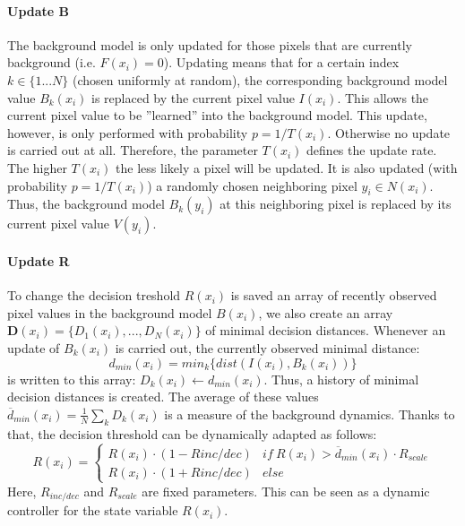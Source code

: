 \paragraph{Update B}
The background model is only updated for those pixels that
are currently background (i.e. $F(x_i) = 0$).
Updating means that for a certain index $k \in \{1...N \}$ (chosen uniformly at random), the corresponding background model value $B_k(x_i)$ is replaced by the current pixel value $I(x_i)$.
This allows the current pixel value to be ”learned” into the background model. This update, however, is only performed with probability $p = 1/T(x_i)$. Otherwise no update
is carried out at all. Therefore, the parameter $T(x_i)$ defines the update rate. The higher $T(x_i)$ the less likely a pixel will be updated.
It is also updated (with probability $p = 1/T(x_i)$) a randomly chosen neighboring pixel $y_i \in N(x_i)$. Thus, the background model $B_k(y_i)$ at this neighboring pixel is replaced by its current pixel value $V(y_i)$.
\paragraph{Update R}
To change the decision treshold $R(x_i)$ is saved an array of recently observed pixel values in the background model $B(x_i)$, we also create an array $\mathbf{D}(x_i) = \{D_1(x_i ),...,D_N(x_i)\}$ of minimal decision distances. Whenever an update of $B_k(x_i)$ is carried out, the currently observed minimal distance:
\[ d_{min}(x_i) = min_k \{dist(I(x_i), B_k(x_i))\} \] is written to this array: $D_k(x_i) \leftarrow d_{min}(x_i)$. Thus, a history of minimal decision distances is created. The average of these values $\overline{d}_{min}(x_i) = \frac{1}{N} \sum_k D_k(x_i)$ is a measure of the background dynamics. Thanks to that, the decision threshold can be dynamically adapted as follows:
\begin{equation} \label{eq:R}
R(x_i)=\begin{cases} R(x_i)\cdot(1-R{inc/dec}) &if\ R(x_i)> \overline{d}_{min}(x_i)\cdot R_{scale} \\ R(x_i)\cdot (1+R{inc/dec}) &else  \end{cases}
\end{equation}
Here, $R_{inc/dec}$ and $R_{scale}$ are fixed parameters. This can be seen as a dynamic controller for the state variable $R(x_i)$.
